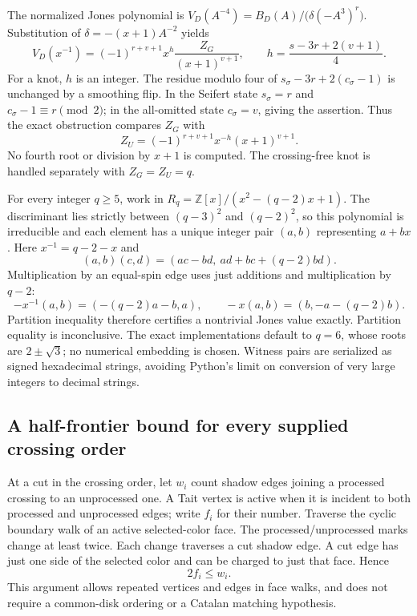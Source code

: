 The normalized Jones polynomial is $V_D(A^{-4})=B_D(A)/
\bigl(\delta(-A^3)^r\bigr)$. Substitution of
$\delta=-(x+1)A^{-2}$ yields
\begin{equation}\label{eq:potts-normalization}
 V_D(x^{-1})=(-1)^{r+v+1}x^h\frac{Z_G}{(x+1)^{v+1}},
 \qquad h=\frac{s-3r+2(v+1)}4.
\end{equation}
For a knot, $h$ is an integer. The residue modulo four of
$s_\sigma-3r+2(c_\sigma-1)$ is unchanged by a smoothing flip.
In the Seifert state $s_\sigma=r$ and $c_\sigma-1\equiv r\pmod2$;
in the all-omitted state $c_\sigma=v$, giving the assertion.
Thus the exact obstruction compares $Z_G$ with
\[
 Z_U=(-1)^{r+v+1}x^{-h}(x+1)^{v+1}.
\]
No fourth root or division by $x+1$ is computed. The crossing-free knot
is handled separately with $Z_G=Z_U=q$.

For every integer $q\ge5$, work in
$R_q=\mathbb Z[x]/(x^2-(q-2)x+1)$.
The discriminant lies strictly between $(q-3)^2$ and $(q-2)^2$, so this
polynomial is irreducible and each element has a unique integer pair
$(a,b)$ representing $a+bx$. Here $x^{-1}=q-2-x$ and
\[
 (a,b)(c,d)=(ac-bd,\ ad+bc+(q-2)bd).
\]
Multiplication by an equal-spin edge uses just additions and multiplication
by $q-2$:
\[
 -x^{-1}(a,b)=(-(q-2)a-b,a),\qquad
 -x(a,b)=(b,-a-(q-2)b).
\]
Partition inequality therefore certifies a nontrivial Jones value exactly.
Partition equality is inconclusive. The exact implementations default to
$q=6$, whose roots are $2\pm\sqrt3$; no numerical embedding is chosen.
Witness pairs are serialized as signed hexadecimal strings, avoiding
Python's limit on conversion of very large integers to decimal strings.

\subsection{A half-frontier bound for every supplied crossing order}
At a cut in the crossing order, let $w_i$ count shadow edges joining a
processed crossing to an unprocessed one. A Tait vertex is active when it
is incident to both processed and unprocessed edges; write $f_i$ for their
number. Traverse the cyclic boundary walk of an active selected-color face.
The processed/unprocessed marks change at least twice. Each change traverses
a cut shadow edge. A cut edge has just one side of the selected color and
can be charged to just that face. Hence
\begin{equation}\label{eq:potts-half-frontier}
 2f_i\le w_i.
\end{equation}
This argument allows repeated vertices and edges in face walks, and does
not require a common-disk ordering or a Catalan matching hypothesis.


